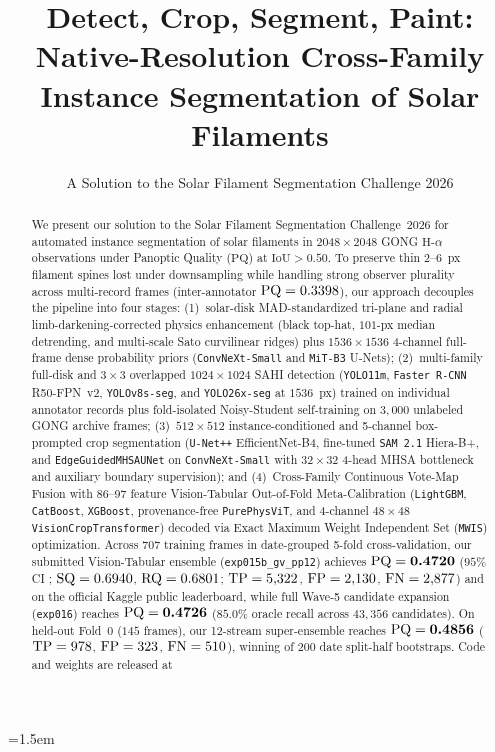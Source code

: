 \documentclass[sigconf]{acmart}
\begin{document}
\emergencystretch=1.5em

\title[Detect, Crop, Segment, Paint]{Detect, Crop, Segment, Paint: Native-Resolution Cross-Family Instance Segmentation of Solar Filaments}
\subtitle{A Solution to the Solar Filament Segmentation Challenge 2026} %

\author{\authorname}
\affiliation{%
  \city{\authorcity}
  \country{\authorcountry}
}
\email{\authoremail}

\author{\coauthorname}
\affiliation{%
  \city{\authorcity}
  \country{\authorcountry}
}
\email{\coauthoremail}

\begin{abstract}
We present our solution to the Solar Filament Segmentation Challenge~2026 for automated instance segmentation of solar filaments in $2048\times 2048$ GONG $\text{H-}\alpha$ observations under Panoptic Quality ($\mathrm{PQ}$) at $\mathrm{IoU} > 0.50$. To preserve thin $2\text{--}6$~px filament spines lost under downsampling while handling strong observer plurality across \multiphotos{} multi-record frames (inter-annotator $\mathrm{PQ} = 0.3398$), our approach decouples the pipeline into four stages: (1)~solar-disk MAD-standardized tri-plane and radial limb-darkening-corrected physics enhancement (black top-hat, $101$-px median detrending, and multi-scale Sato curvilinear ridges) plus $1536\times 1536$ 4-channel full-frame dense probability priors (\texttt{ConvNeXt-Small} and \texttt{MiT-B3} U-Nets); (2)~multi-family full-disk and $3\times 3$ overlapped $1024\times 1024$ SAHI detection (\texttt{YOLO11m}, \texttt{Faster R-CNN} R50-FPN~v2, \texttt{YOLOv8s-seg}, and \texttt{YOLO26x-seg} at $1536$~px) trained on individual annotator records plus fold-isolated Noisy-Student self-training on $3{,}000$ unlabeled GONG archive frames; (3)~$512\times 512$ instance-conditioned and 5-channel box-prompted crop segmentation (\texttt{U-Net++} EfficientNet-B4, fine-tuned \texttt{SAM~2.1} Hiera-B+, and \texttt{EdgeGuidedMHSAUNet} on \texttt{ConvNeXt-Small} with $32\times 32$ 4-head MHSA bottleneck and auxiliary boundary supervision); and (4)~Cross-Family Continuous Vote-Map Fusion with 86--97 feature Vision-Tabular Out-of-Fold Meta-Calibration (\texttt{LightGBM}, \texttt{CatBoost}, \texttt{XGBoost}, provenance-free \texttt{PurePhysViT}, and 4-channel $48\times 48$ \texttt{VisionCropTransformer}) decoded via Exact Maximum Weight Independent Set (\texttt{MWIS}) optimization. Across $707$ training frames in date-grouped 5-fold cross-validation, our submitted Vision-Tabular ensemble (\texttt{exp015b\_gv\_pp12}) achieves $\mathrm{PQ} = \textbf{0.4720}$ ($95\%$ CI \oofci; $\mathrm{SQ} = 0.6940$, $\mathrm{RQ} = 0.6801$; $\mathrm{TP} = 5{,}322$, $\mathrm{FP} = 2{,}130$, $\mathrm{FN} = 2{,}877$) and \textbf{\lbpq} on the official Kaggle public leaderboard, while full Wave-5 candidate expansion (\texttt{exp016}) reaches $\mathrm{PQ} = \textbf{0.4726}$ ($85.0\%$ oracle recall across $43{,}356$ candidates). On held-out Fold~0 ($145$ frames), our 12-stream super-ensemble reaches $\mathrm{PQ} = \textbf{0.4856}$ ($\mathrm{TP} = 978$, $\mathrm{FP} = 323$, $\mathrm{FN} = 510$), winning \textbf{\superwin} of 200 date split-half bootstraps. Code and weights are released at 
\end{abstract}
\end{document}

